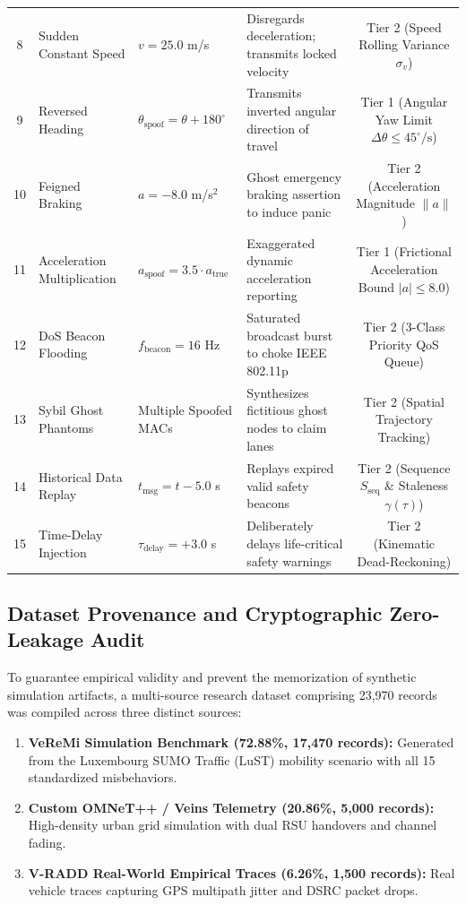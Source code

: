\documentclass[conference]{IEEEtran}
\begin{document}
\begin{table}[t]
{\begin{tabular}{clp{3.8cm}p{6.0cm}c}
8 & Sudden Constant Speed & $v = 25.0$ m/s & Disregards deceleration; transmits locked velocity & Tier 2 (Speed Rolling Variance $\sigma_v$) \\
9 & Reversed Heading & $\theta_{\text{spoof}} = \theta + 180^\circ$ & Transmits inverted angular direction of travel & Tier 1 (Angular Yaw Limit $\Delta\theta \le 45^\circ/\text{s}$) \\
10 & Feigned Braking & $a = -8.0$ m/s$^2$ & Ghost emergency braking assertion to induce panic & Tier 2 (Acceleration Magnitude $\|a\|$) \\
11 & Acceleration Multiplication & $a_{\text{spoof}} = 3.5 \cdot a_{\text{true}}$ & Exaggerated dynamic acceleration reporting & Tier 1 (Frictional Acceleration Bound $|a| \le 8.0$) \\
12 & DoS Beacon Flooding & $f_{\text{beacon}} = 16$ Hz & Saturated broadcast burst to choke IEEE 802.11p & Tier 2 (3-Class Priority QoS Queue) \\
13 & Sybil Ghost Phantoms & Multiple Spoofed MACs & Synthesizes fictitious ghost nodes to claim lanes & Tier 2 (Spatial Trajectory Tracking) \\
14 & Historical Data Replay & $t_{\text{msg}} = t - 5.0$ s & Replays expired valid safety beacons & Tier 2 (Sequence $S_{\text{seq}}$ \& Staleness $\gamma(\tau)$) \\
15 & Time-Delay Injection & $\tau_{\text{delay}} = +3.0$ s & Deliberately delays life-critical safety warnings & Tier 2 (Kinematic Dead-Reckoning) \\
\bottomrule
\end{tabular}%
}
\end{table}

\subsection{Dataset Provenance and Cryptographic Zero-Leakage Audit}

To guarantee empirical validity and prevent the memorization of synthetic simulation artifacts, a multi-source research dataset comprising 23,970 records was compiled across three distinct sources:
\begin{enumerate}
    \item \textbf{VeReMi Simulation Benchmark (72.88\%, 17,470 records):} Generated from the Luxembourg SUMO Traffic (LuST) mobility scenario with all 15 standardized misbehaviors.
    \item \textbf{Custom OMNeT++ / Veins Telemetry (20.86\%, 5,000 records):} High-density urban grid simulation with dual RSU handovers and channel fading.
    \item \textbf{V-RADD Real-World Empirical Traces (6.26\%, 1,500 records):} Real vehicle traces capturing GPS multipath jitter and DSRC packet drops.
\end{enumerate}
\end{document}
